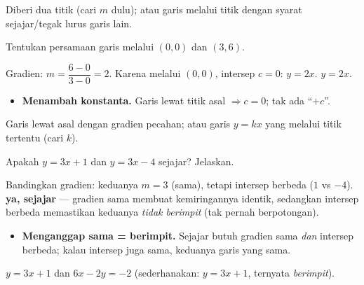 \begin{variasi}
Diberi dua titik (cari $m$ dulu); atau garis melalui titik dengan syarat
sejajar/tegak lurus garis lain.
\end{variasi}

\begin{soalbox}{}
Tentukan persamaan garis melalui $(0,0)$ dan $(3,6)$.
\end{soalbox}

\jawab
{} Gradien: $m=\dfrac{6-0}{3-0}=2$.
 Karena melalui $(0,0)$, intersep $c=0$: $y=2x$.
\jadi $y=2x$.

\begin{jebakan}
\begin{itemize}[leftmargin=*,topsep=2pt]
  \item \textbf{Menambah konstanta.} Garis lewat titik asal $\Rightarrow c=0$;
  tak ada ``$+c$''.
\end{itemize}
\end{jebakan}

\begin{variasi}
Garis lewat asal dengan gradien pecahan; atau garis $y=kx$ yang melalui titik
tertentu (cari $k$).
\end{variasi}

\begin{soalbox}{}
Apakah $y=3x+1$ dan $y=3x-4$ sejajar? Jelaskan.
\end{soalbox}

\jawab
{} Bandingkan gradien: keduanya $m=3$ (sama), tetapi intersep berbeda
($1$ vs $-4$).
\jadi \textbf{ya, sejajar} --- gradien sama membuat kemiringannya identik,
sedangkan intersep berbeda memastikan keduanya \emph{tidak berimpit} (tak pernah
berpotongan).

\begin{jebakan}
\begin{itemize}[leftmargin=*,topsep=2pt]
  \item \textbf{Menganggap sama = berimpit.} Sejajar butuh gradien sama
  \emph{dan} intersep berbeda; kalau intersep juga sama, keduanya garis yang
  sama.
\end{itemize}
\end{jebakan}

\begin{variasi}
$y=3x+1$ dan $6x-2y=-2$ (sederhanakan: $y=3x+1$, ternyata \emph{berimpit}).
\end{variasi}

